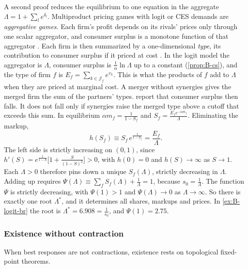 \begin{remark}\label{rem:B-aggregative}
A second proof reduces the equilibrium to one equation in the aggregate $\Lambda = 1 + \sum_le^{\delta_l}$.
Multiproduct pricing games with logit or CES demands are \emph{aggregative games}. Each firm's profit depends
on its rivals' prices only through one scalar aggregator, and consumer surplus is a monotone function of that
aggregator \citep{NockeSchutz2018}. Each firm is then summarized by a one-dimensional \emph{type}, its
contribution to consumer surplus if it priced at cost \citep[p.~229 and fn.~127]{AskerNocke2021}. In the logit
model the aggregator is $\Lambda$, consumer surplus is $\frac{1}{\alpha}\ln\Lambda$ up to a constant
(\cref{prop:B-cs}), and the type of firm $f$ is $E_f = \sum_{k \in \mathcal{J}_f}e^{v_k}$. This is what the products
of $f$ add to $\Lambda$ when they are priced at marginal cost. A merger without synergies gives the merged firm
the sum of the partners' types. \citet[p.~229]{AskerNocke2021} report that consumer surplus then falls. It does
not fall only if synergies raise the merged type above a cutoff that exceeds this sum. In equilibrium $\alpha m_f = \frac{1}{1 - S_f}$ and
$S_f = \frac{E_fe^{-\alpha m_f}}{\Lambda}$. Eliminating the markup,
\begin{equation*}
  h(S_f) \equiv S_f\,e^{\frac{1}{1 - S_f}} = \frac{E_f}{\Lambda}.
\end{equation*}
The left side is strictly increasing on $(0,1)$, since $h'(S) = e^{\frac{1}{1-S}}\big[1 + \frac{S}{(1 - S)^2}\big]
> 0$, with $h(0) = 0$ and $h(S) \to \infty$ as $S \to 1$. Each $\Lambda > 0$ therefore pins down a unique
$S_f(\Lambda)$, strictly decreasing in $\Lambda$. Adding up requires $\Psi(\Lambda) \equiv \sum_fS_f(\Lambda) +
\frac{1}{\Lambda} = 1$, because $s_0 = \frac{1}{\Lambda}$. The function $\Psi$ is strictly decreasing, with
$\Psi(1) > 1$ and $\Psi(\Lambda) \to 0$ as $\Lambda \to \infty$. So there is exactly one root $\Lambda^*$, and it
determines all shares, markups and prices. In \cref{ex:B-logit-br} the root is $\Lambda^* = 6.908 =
\frac{1}{s_0}$, and $\Psi(1) = 2.75$.
\end{remark}

\subsubsection{Existence without contraction}

When best responses are not contractions, existence rests on topological fixed-point theorems.


